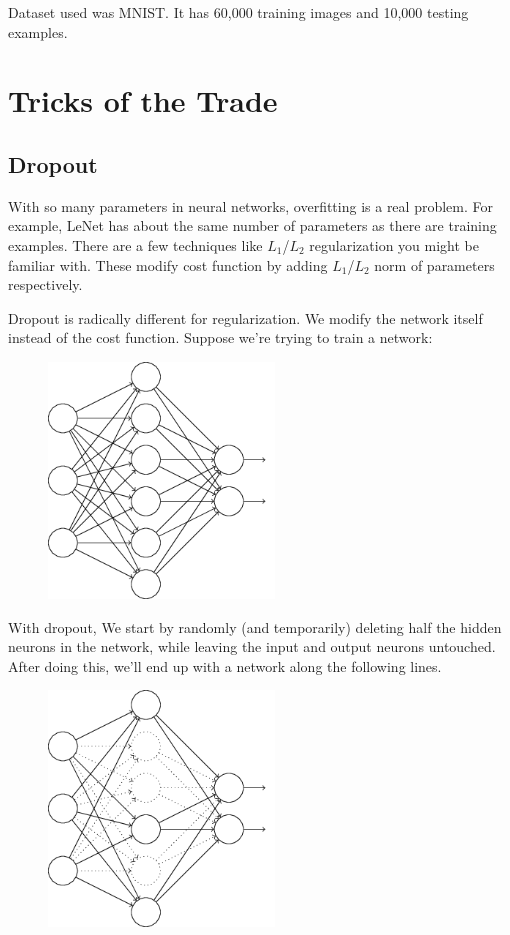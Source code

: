 \documentclass[a4paper]{tufte-handout}
\begin{document}
Dataset used was MNIST. It has 60,000 training images and 10,000 testing
examples.

\section{Tricks of the Trade}\label{tricks-of-the-trade}

\subsection{Dropout}\label{dropout}

With so many parameters in neural networks, overfitting is a real
problem. For example, LeNet has about the same number of parameters as
there are training examples. There are a few techniques like
\(L_1\)/\(L_2\) regularization you might be familiar with. These modify
cost function by adding \(L_1\)/\(L_2\) norm of parameters respectively.

Dropout is radically different for regularization. We modify the network
itself instead of the cost function. Suppose we're trying to train a
network:

\begin{figure}
\includegraphics[width=60mm]{dropout1.png}
\end{figure}


With dropout, We start by randomly (and temporarily) deleting half the
hidden neurons in the network, while leaving the input and output
neurons untouched. After doing this, we'll end up with a network along
the following lines.


\begin{figure}
\includegraphics[width=60mm]{dropout2.png}
\end{figure}
\end{document}

